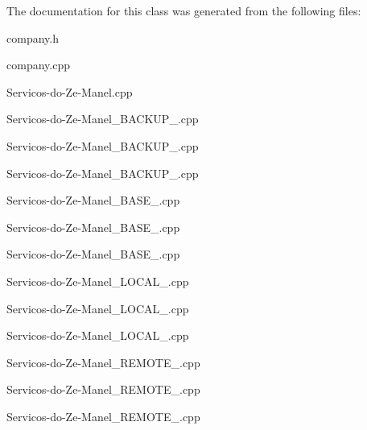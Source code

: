 The documentation for this class was generated from the following files\+:\begin{DoxyCompactItemize}
\item 
company.\+h\item 
company.\+cpp\item 
Servicos-\/do-\/\+Ze-\/\+Manel.\+cpp\item 
Servicos-\/do-\/\+Ze-\/\+Manel\+\_\+\+B\+A\+C\+K\+U\+P\+\_.\+cpp\item 
Servicos-\/do-\/\+Ze-\/\+Manel\+\_\+\+B\+A\+C\+K\+U\+P\+\_.\+cpp\item 
Servicos-\/do-\/\+Ze-\/\+Manel\+\_\+\+B\+A\+C\+K\+U\+P\+\_.\+cpp\item 
Servicos-\/do-\/\+Ze-\/\+Manel\+\_\+\+B\+A\+S\+E\+\_.\+cpp\item 
Servicos-\/do-\/\+Ze-\/\+Manel\+\_\+\+B\+A\+S\+E\+\_.\+cpp\item 
Servicos-\/do-\/\+Ze-\/\+Manel\+\_\+\+B\+A\+S\+E\+\_.\+cpp\item 
Servicos-\/do-\/\+Ze-\/\+Manel\+\_\+\+L\+O\+C\+A\+L\+\_.\+cpp\item 
Servicos-\/do-\/\+Ze-\/\+Manel\+\_\+\+L\+O\+C\+A\+L\+\_.\+cpp\item 
Servicos-\/do-\/\+Ze-\/\+Manel\+\_\+\+L\+O\+C\+A\+L\+\_.\+cpp\item 
Servicos-\/do-\/\+Ze-\/\+Manel\+\_\+\+R\+E\+M\+O\+T\+E\+\_.\+cpp\item 
Servicos-\/do-\/\+Ze-\/\+Manel\+\_\+\+R\+E\+M\+O\+T\+E\+\_.\+cpp\item 
Servicos-\/do-\/\+Ze-\/\+Manel\+\_\+\+R\+E\+M\+O\+T\+E\+\_.\+cpp\end{DoxyCompactItemize}
